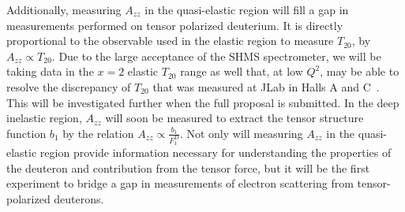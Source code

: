 Additionally, measuring $A_{zz}$ in the quasi-elastic region will fill a gap in measurements performed on tensor polarized deuterium. It is directly proportional to the observable used in the elastic region to measure $T_{20}$, 
by $A_{zz} \propto T_{20}$. Due to the large acceptance of the SHMS spectrometer, we will be taking data in the $x = 2$ elastic $T_{20}$ range as well that, at low $Q^2$, may be able to resolve the discrepancy of $T_{20}$ that was measured at JLab in Halls A and C~\cite{Abbott:2000fg}. This will be investigated further when the full proposal is submitted.  
In the deep inelastic region, $A_{zz}$ will soon be measured to extract the tensor structure function $b_1$ by the relation $A_{zz} \propto \frac{b_1}{F_1^D}$. Not only will measuring $A_{zz}$ in the quasi-elastic region provide information necessary for understanding the properties of the deuteron and contribution from the tensor force, but it will be the first experiment to bridge a gap in measurements of electron scattering from tensor-polarized deuterons.






